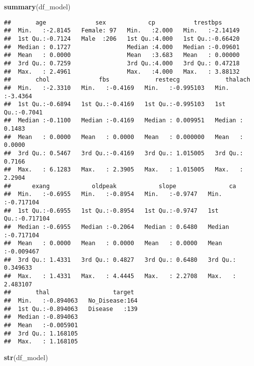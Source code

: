 \documentclass[
]{article}
\newenvironment{Shaded}{\begin{snugshade}}{\end{snugshade}}
\newcommand{\FunctionTok}[1]{\textcolor[rgb]{0.13,0.29,0.53}{\textbf{#1}}}
\newcommand{\NormalTok}[1]{#1}
\begin{document}
\begin{Shaded}
\begin{Highlighting}[]
\FunctionTok{summary}\NormalTok{(df\_model)}
\end{Highlighting}
\end{Shaded}

\begin{verbatim}
##       age              sex            cp           trestbps       
##  Min.   :-2.8145   Female: 97   Min.   :2.000   Min.   :-2.14149  
##  1st Qu.:-0.7124   Male  :206   1st Qu.:4.000   1st Qu.:-0.66420  
##  Median : 0.1727                Median :4.000   Median :-0.09601  
##  Mean   : 0.0000                Mean   :3.683   Mean   : 0.00000  
##  3rd Qu.: 0.7259                3rd Qu.:4.000   3rd Qu.: 0.47218  
##  Max.   : 2.4961                Max.   :4.000   Max.   : 3.88132  
##       chol              fbs             restecg             thalach       
##  Min.   :-2.3310   Min.   :-0.4169   Min.   :-0.995103   Min.   :-3.4364  
##  1st Qu.:-0.6894   1st Qu.:-0.4169   1st Qu.:-0.995103   1st Qu.:-0.7041  
##  Median :-0.1100   Median :-0.4169   Median : 0.009951   Median : 0.1483  
##  Mean   : 0.0000   Mean   : 0.0000   Mean   : 0.000000   Mean   : 0.0000  
##  3rd Qu.: 0.5467   3rd Qu.:-0.4169   3rd Qu.: 1.015005   3rd Qu.: 0.7166  
##  Max.   : 6.1283   Max.   : 2.3905   Max.   : 1.015005   Max.   : 2.2904  
##      exang            oldpeak            slope               ca           
##  Min.   :-0.6955   Min.   :-0.8954   Min.   :-0.9747   Min.   :-0.717104  
##  1st Qu.:-0.6955   1st Qu.:-0.8954   1st Qu.:-0.9747   1st Qu.:-0.717104  
##  Median :-0.6955   Median :-0.2064   Median : 0.6480   Median :-0.717104  
##  Mean   : 0.0000   Mean   : 0.0000   Mean   : 0.0000   Mean   :-0.009467  
##  3rd Qu.: 1.4331   3rd Qu.: 0.4827   3rd Qu.: 0.6480   3rd Qu.: 0.349633  
##  Max.   : 1.4331   Max.   : 4.4445   Max.   : 2.2708   Max.   : 2.483107  
##       thal                  target   
##  Min.   :-0.894063   No_Disease:164  
##  1st Qu.:-0.894063   Disease   :139  
##  Median :-0.894063                   
##  Mean   :-0.005901                   
##  3rd Qu.: 1.168105                   
##  Max.   : 1.168105
\end{verbatim}

\begin{Shaded}
\begin{Highlighting}[]
\FunctionTok{str}\NormalTok{(df\_model)}
\end{Highlighting}
\end{Shaded}
\end{document}
